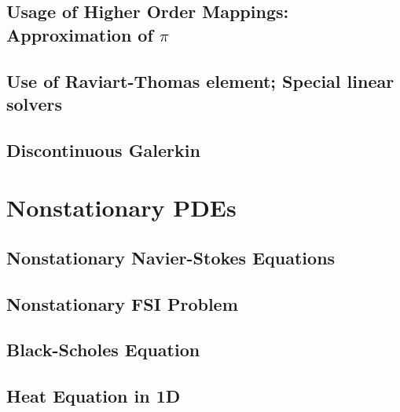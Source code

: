 \documentclass[a4paper,cleardoubleempty]{scrreprt}
\theoremstyle{plain}
\theoremstyle{remark}
\begin{document}
\subsection{Usage of Higher Order Mappings: Approximation of $\pi$}
\label{PDE_higher_order_mapping}

\clearpage
\subsection{Use of Raviart-Thomas element; Special linear solvers}
\label{PDE_RT}

\clearpage
\subsection{Discontinuous Galerkin}
\label{PDE_dG}

\clearpage
\section{Nonstationary PDEs}
\label{PDE_Instat}

\subsection{Nonstationary Navier-Stokes Equations}
\label{PDE_Instat_Stokes}

\clearpage
\subsection{Nonstationary FSI Problem}
\label{PDE_Instat_FSI}

\clearpage
\subsection{Black-Scholes Equation}
\label{PDE_Instat_Black_Scholes}

\clearpage
\subsection{Heat Equation in 1D}
\label{PDE_Instat_Heat_1D}

\clearpage
\end{document}
